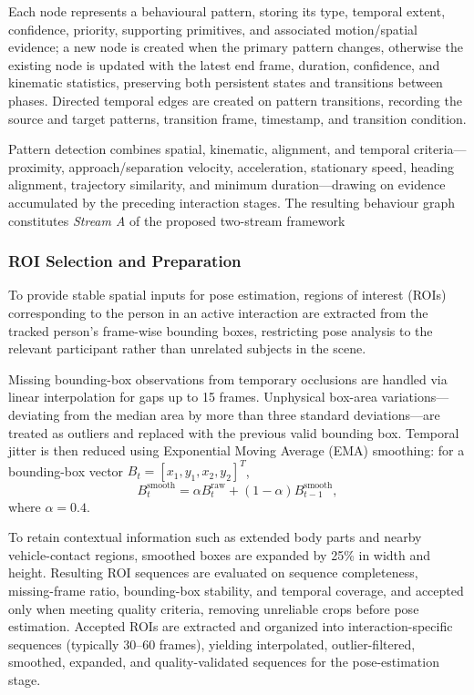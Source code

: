\documentclass[runningheads]{llncs}
\begin{document}
Each node represents a behavioural pattern, storing its type, temporal
extent, confidence, priority, supporting primitives, and associated
motion/spatial evidence; a new node is created when the primary pattern
changes, otherwise the existing node is updated with the latest end
frame, duration, confidence, and kinematic statistics, preserving both
persistent states and transitions between phases. Directed temporal
edges are created on pattern transitions, recording the source and
target patterns, transition frame, timestamp, and transition condition. 

Pattern detection combines spatial, kinematic, alignment, and temporal
criteria—proximity, approach/separation velocity, acceleration,
stationary speed, heading alignment, trajectory similarity, and minimum
duration—drawing on evidence accumulated by the preceding interaction
stages. The resulting behaviour graph constitutes \textit{Stream A} of the proposed two-stream framework

\subsubsection{ROI Selection and Preparation}
To provide stable spatial inputs for pose estimation, regions of
interest (ROIs) corresponding to the person in an active interaction
are extracted from the tracked person's frame-wise bounding boxes,
restricting pose analysis to the relevant participant rather than
unrelated subjects in the scene.

Missing bounding-box observations from temporary occlusions are handled
via linear interpolation for gaps up to 15 frames. Unphysical box-area
variations—deviating from the median area by more than three standard
deviations—are treated as outliers and replaced with the previous valid
bounding box. Temporal jitter is then reduced using Exponential Moving
Average (EMA) smoothing: for a bounding-box vector
$B_t=[x_1,y_1,x_2,y_2]^T$,
\begin{equation}
B_t^{\mathrm{smooth}}
=
\alpha B_t^{\mathrm{raw}}
+
(1-\alpha)B_{t-1}^{\mathrm{smooth}},
\end{equation}
where $\alpha=0.4$.

To retain contextual information such as extended body parts and nearby
vehicle-contact regions, smoothed boxes are expanded by 25\% in width
and height. Resulting ROI sequences are evaluated on sequence
completeness, missing-frame ratio, bounding-box stability, and temporal
coverage, and accepted only when meeting quality criteria, removing
unreliable crops before pose estimation. Accepted ROIs are extracted
and organized into interaction-specific sequences (typically 30--60
frames), yielding interpolated, outlier-filtered, smoothed, expanded,
and quality-validated sequences for the pose-estimation stage.
\end{document}
